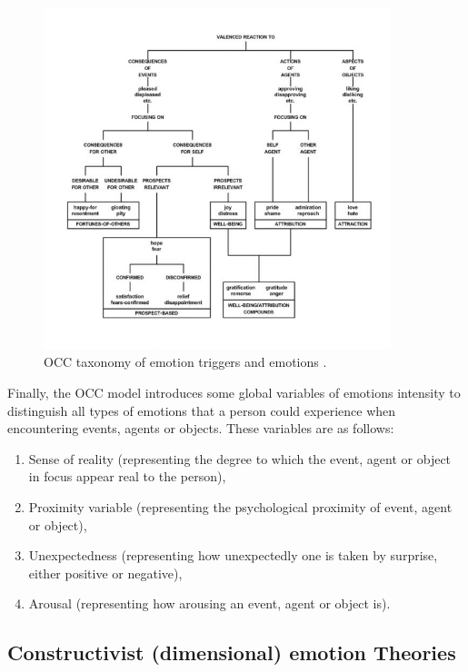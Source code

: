 \documentclass[11pt]{article}
\begin{document}
\begin{figure}[tbh]
  \center
  \includegraphics[width=0.9\textwidth]{figure/occ-structure.jpg}
  \caption{OCC taxonomy of emotion triggers and emotions \cite{occ:structure}.}
  \label{fig:occ-structure}
\end{figure}

Finally, the OCC model introduces some global variables of emotions intensity to
distinguish all types of emotions that a person could experience when
encountering events, agents or objects. These variables are as follows:

\begin{enumerate}
	\item Sense of reality (representing the degree to which the event, agent or
	object in focus appear real to the person),

	\item Proximity variable (representing the psychological proximity of event,
	agent or object),

	\item Unexpectedness (representing how unexpectedly one is taken by surprise,
	either positive or negative),

	\item Arousal (representing how arousing an event, agent or object is).
\end{enumerate}

\subsection{Constructivist (dimensional) emotion Theories}
\label{sec:dimensional-emotions}
\end{document}
